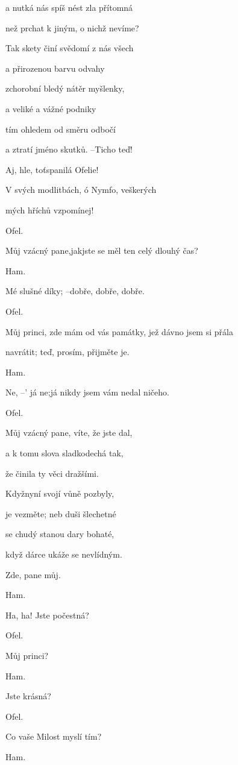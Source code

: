 \documentclass[11pt]{article}
\begin{document}
\begin{multicols}{2}
    a nutká nás spíš nést zla přítomná

    než prchat k jiným, o nichž nevíme?

    Tak skety činí svědomí z nás všech

    a přirozenou barvu odvahy

    zchorobní bledý nátěr myšlenky,

    a veliké a vážné podniky

    tím ohledem od směru odbočí

    a ztratí jméno skutků. –Ticho teď!

    Aj, hle, toťspanilá Ofelie!

    V svých modlitbách, ó Nymfo, veškerých

    mých hříchů vzpomínej!

    Ofel.

    Můj vzácný pane,jakjste se měl ten celý dlouhý čas?

    Ham.

    Mé slušné díky; –dobře, dobře, dobře.

    Ofel.

    Můj princi, zde mám od vás památky, jež dávno jsem si přála

    navrátit; teď, prosím, přijměte je.

    Ham.

    Ne, –’ já ne;já nikdy jsem vám nedal ničeho.

    Ofel.

    Můj vzácný pane, víte, že jste dal,

    a k tomu slova sladkodechá tak,

    že činila ty věci dražšími.

    Kdyžnyní svojí vůně pozbyly,

    je vezměte; neb duši šlechetné

    se chudý stanou dary bohaté,

    když dárce ukáže se nevlídným.

    Zde, pane můj.

    Ham.

    Ha, ha! Jste počestná?

    Ofel.

    Můj princi?

    Ham.

    Jste krásná?

    Ofel.

    Co vaše Milost myslí tím?

    Ham.


\end{multicols}
\end{document}
